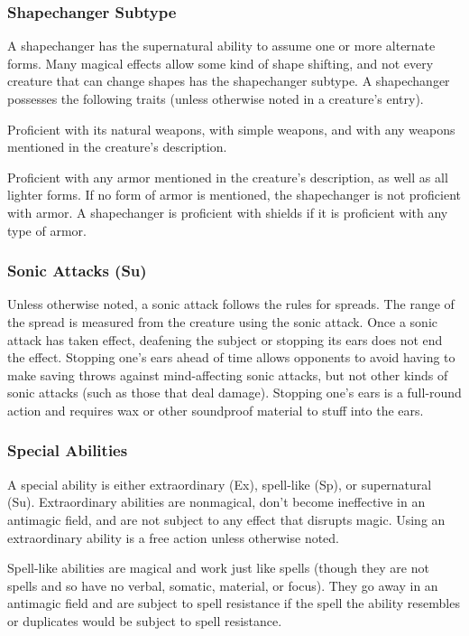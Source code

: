 \subsubsection{Shapechanger Subtype} A shapechanger has the supernatural ability to assume one or more alternate forms. Many magical effects allow some kind of shape shifting, and not every creature that can change shapes has the shapechanger subtype. 
 A shapechanger possesses the following traits (unless otherwise noted in a creature's entry).
\begin{itemize*}
\item Proficient with its natural weapons, with simple weapons, and with any weapons mentioned in the creature's description.
\item Proficient with any armor mentioned in the creature's description, as well as all lighter forms. If no form of armor is mentioned, the shapechanger is not proficient with armor. A shapechanger is proficient with shields if it is proficient with any type of armor.
\end{itemize*}

\subsubsection{Sonic Attacks (Su)} Unless otherwise noted, a sonic attack follows the rules for spreads. The range of the spread is measured from the creature using the sonic attack. Once a sonic attack has taken effect, deafening the subject or stopping its ears does not end the effect. Stopping one's ears ahead of time allows opponents to avoid having to make saving throws against mind-affecting sonic attacks, but not other kinds of sonic attacks (such as those that deal damage). Stopping one's ears is a full-round action and requires wax or other soundproof material to stuff into the ears.

\subsubsection{Special Abilities} A special ability is either extraordinary (Ex), spell-like (Sp), or supernatural (Su).
 Extraordinary abilities are nonmagical, don't become ineffective in an antimagic field, and are not subject to any effect that disrupts magic. Using an extraordinary ability is a free action unless otherwise noted.

 Spell-like abilities are magical and work just like spells (though they are not spells and so have no verbal, somatic, material, or focus). They go away in an antimagic field and are subject to spell resistance if the spell the ability resembles or duplicates would be subject to spell resistance.


